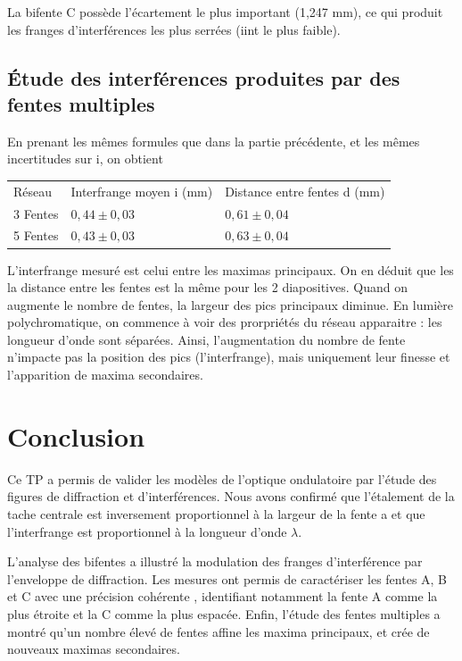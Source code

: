 \documentclass[a4paper,9pt,french]{scrartcl}
\begin{document}
La bifente C possède l'écartement le plus important (1,247 mm), ce qui produit les franges d'interférences les plus serrées (iint le plus faible).
\subsection{Étude des interférences produites par des fentes multiples}
En prenant les m\^emes formules que dans la partie précédente, et les m\^emes incertitudes sur i, on obtient
\begin{center}
\begin{tabular}{lll}
Réseau & Interfrange moyen i (mm) & Distance entre fentes d (mm)\\
3 Fentes & \(0,44\pm0,03\) & \(0,61\pm0,04\)\\
5 Fentes & \(0,43\pm0,03\) & \(0,63\pm0,04\)
\end{tabular}
\end{center}
L'interfrange mesuré est celui entre les maximas principaux. On en déduit que les la distance entre les fentes est la m\^eme pour les 2 diapositives. Quand on augmente le nombre de fentes, la largeur des pics principaux diminue. En lumière polychromatique, on commence à voir des prorpriétés du réseau apparaitre : les longueur d'onde sont séparées. Ainsi, l'augmentation du nombre de fente n'impacte pas la position des pics (l'interfrange), mais uniquement leur finesse et l'apparition de maxima secondaires.
\section{Conclusion}
Ce TP a permis de valider les modèles de l'optique ondulatoire par l'étude des figures de diffraction et d'interférences. Nous avons confirmé que l'étalement de la tache centrale est inversement proportionnel à la largeur de la fente a et que l'interfrange est proportionnel à la longueur d'onde \(\lambda\).

L'analyse des bifentes a illustré la modulation des franges d'interférence par l'enveloppe de diffraction. Les mesures ont permis de caractériser les fentes A, B et C avec une précision cohérente , identifiant notamment la fente A comme la plus étroite et la C comme la plus espacée. Enfin, l'étude des fentes multiples a montré qu'un nombre élevé de fentes affine les maxima principaux, et crée de nouveaux maximas secondaires.
\end{document}
